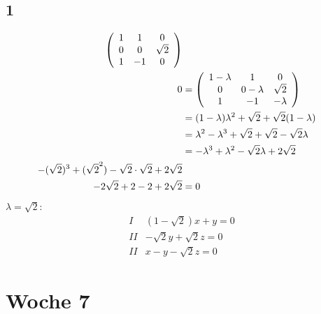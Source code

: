 \documentclass{article}
\begin{document}
\subsection*{1}
\begin{align*}
    \left(\begin{array}{c c c}
        1&1&0\\0&0&\sqrt{2}\\1&-1&0
    \end{array}\right)\\
    0&=\left(\begin{array}{c c c}
        1-\lambda&1&0\\0&0-\lambda&\sqrt{2}\\1&-1&-\lambda
    \end{array}\right)\\
    &= (1-\lambda)\lambda^2+\sqrt{2}+\sqrt{2}(1-\lambda)\\
    &= \lambda^2-\lambda^3+\sqrt{2}+\sqrt{2}-\sqrt{2}\lambda\\
    &= -\lambda^3+\lambda^2-\sqrt{2}\lambda+2\sqrt{2}\\
    -(\sqrt{2})^3+(\sqrt{2}^2)-\sqrt{2}\cdot\sqrt{2}+2\sqrt{2}\\
    -2\sqrt{2}+2-2+2\sqrt{2}&=0\\
\end{align*}
$\lambda =\sqrt{2}$:
\begin{align*}
    I &(1-\sqrt{2})x+y=0\\
    II &-\sqrt{2}y+\sqrt{2}z=0\\
    II &x-y-\sqrt{2}z=0
\end{align*}

\section*{Woche 7}
\end{document}
